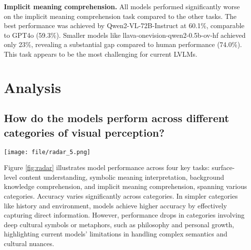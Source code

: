 \textbf{Implicit meaning comprehension.} All models performed significantly worse on the implicit meaning comprehension task compared to the other tasks. The best performance was achieved by Qwen2-VL-72B-Instruct at 60.1\%, comparable to GPT4o (59.3\%). Smaller models like llava-onevision-qwen2-0.5b-ov-hf achieved only 23\%, revealing a substantial gap compared to human performance (74.0\%). This task appears to be the most challenging for current LVLMs.


\section{Analysis}


\subsection{How do the models perform across different categories of visual perception?}
\begin{figure*}[t]
    \centering
    \texttt{[image: file/radar\_5.png]}
    
    \caption{The radar charts illustrate the performance of various representative models in interpreting images across different categories within our four tasks.}
    \label{fig:radar}
\end{figure*}
    
Figure \ref{fig:radar} illustrates model performance across four key tasks: surface-level content understanding, symbolic meaning interpretation, background knowledge comprehension, and implicit meaning comprehension, spanning various categories. Accuracy varies significantly across categories. In simpler categories like history and environment, models achieve higher accuracy by effectively capturing direct information. However, performance drops in categories involving deep cultural symbols or metaphors, such as philosophy and personal growth, highlighting current models' limitations in handling complex semantics and cultural nuances.

